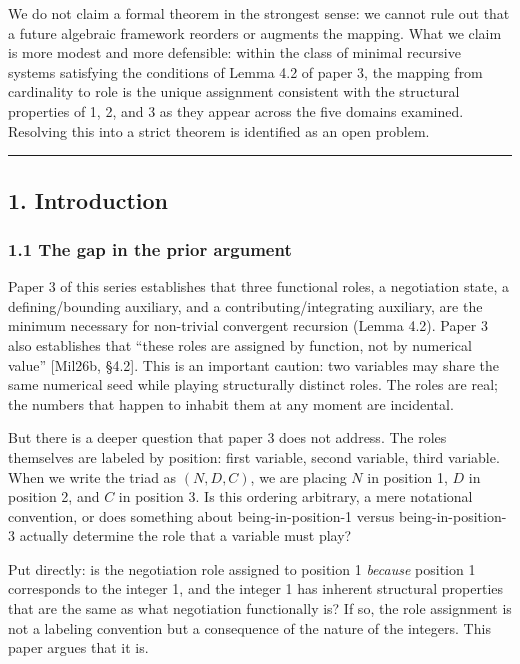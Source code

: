 \documentclass[
  11pt,
  letterpaper,
]{article}
\begin{document}
We do not claim a formal theorem in the strongest sense: we cannot rule
out that a future algebraic framework reorders or augments the mapping.
What we claim is more modest and more defensible: within the class of
minimal recursive systems satisfying the conditions of Lemma 4.2 of
paper 3, the mapping from cardinality to role is the unique assignment
consistent with the structural properties of 1, 2, and 3 as they appear
across the five domains examined. Resolving this into a strict theorem
is identified as an open problem.

\begin{center}\rule{0.5\linewidth}{0.5pt}\end{center}

\subsection{1. Introduction}\label{introduction}

\subsubsection{1.1 The gap in the prior
argument}\label{the-gap-in-the-prior-argument}

Paper 3 of this series establishes that three functional roles, a
negotiation state, a defining/bounding auxiliary, and a
contributing/integrating auxiliary, are the minimum necessary for
non-trivial convergent recursion (Lemma 4.2). Paper 3 also establishes
that ``these roles are assigned by function, not by numerical value''
{[}Mil26b, §4.2{]}. This is an important caution: two variables may
share the same numerical seed while playing structurally distinct roles.
The roles are real; the numbers that happen to inhabit them at any
moment are incidental.

But there is a deeper question that paper 3 does not address. The roles
themselves are labeled by position: first variable, second variable,
third variable. When we write the triad as \((N, D, C)\), we are placing
\(N\) in position 1, \(D\) in position 2, and \(C\) in position 3. Is
this ordering arbitrary, a mere notational convention, or does something
about being-in-position-1 versus being-in-position-3 actually determine
the role that a variable must play?

Put directly: is the negotiation role assigned to position 1
\emph{because} position 1 corresponds to the integer 1, and the integer
1 has inherent structural properties that are the same as what
negotiation functionally is? If so, the role assignment is not a
labeling convention but a consequence of the nature of the integers.
This paper argues that it is.
\end{document}
